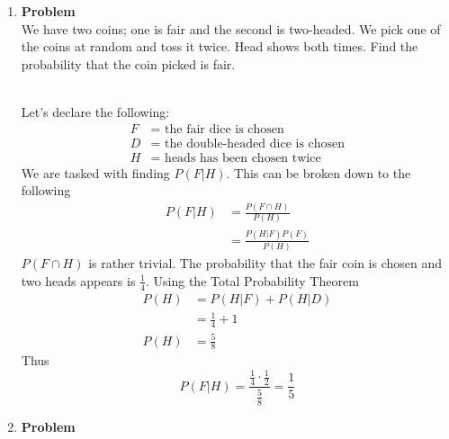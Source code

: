 \documentclass[12pt]{article}
\newenvironment{Ex}{\textbf{Problem}\vspace{.75em}\\}{}
\begin{document}
\begin{enumerate}
\item
  \begin{Ex}
    We have two coins; one is fair and the second is two-headed. We
    pick one of the coins at random and toss it twice. Head shows both
    times. Find the probability that the coin picked is fair.
    \begin{solution} \hfill \vspace{0.75em} \\
      Let's declare the following:
      \begin{equation}
        \label{eq:3-var-declaration}
        \begin{aligned}
          F &= \text{ the fair dice is chosen} \\
          D &= \text{ the double-headed dice is chosen} \\
          H &= \text{ heads has been chosen twice}
        \end{aligned}
      \end{equation}
      We are tasked with finding $P(F|H)$. This can be broken down to
      the following
      \begin{equation}
        \label{eq:3-enumeration}
        \begin{aligned}
          P(F|H) &= \frac{P(F \cap H)}{P(H)} \\
          &= \frac{P(H|F)P(F)}{P(H)}
        \end{aligned}
      \end{equation}
      $P(F \cap H)$ is rather trivial. The probability that the fair
      coin is chosen and two heads appears is $\frac{1}{4}$. Using the
      Total Probability Theorem
      \begin{equation}
        \label{eq:3-total-probability}
        \begin{aligned}
          P(H) &= P(H|F) + P(H|D) \\
          &= \frac{1}{4} + 1 \\
          P(H) &= \frac{5}{8}
        \end{aligned}
      \end{equation}
      Thus
      \begin{equation}
        \label{eq:3-solution}
        P(F|H) = \frac{\frac{1}{4}\cdot\frac{1}{2}}{\frac{5}{8}} = \frac{1}{5}
      \end{equation}
    \end{solution}
  \end{Ex}
\item
  \begin{Ex}

\end{Ex}
\end{enumerate}
\end{document}
